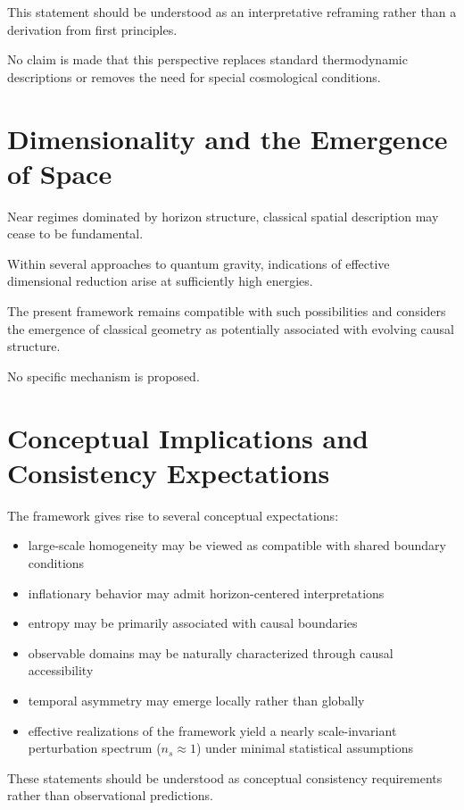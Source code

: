 \documentclass[12pt,a4paper]{article}
\begin{document}
This statement should be understood as an interpretative reframing rather than a derivation from first principles.

No claim is made that this perspective replaces standard thermodynamic descriptions or removes the need for special cosmological conditions.

\section{Dimensionality and the Emergence of Space}

Near regimes dominated by horizon structure, classical spatial description may cease to be fundamental.

Within several approaches to quantum gravity, indications of effective dimensional reduction arise at sufficiently high energies.

The present framework remains compatible with such possibilities and considers the emergence of classical geometry as potentially associated with evolving causal structure.

No specific mechanism is proposed.

\section{Conceptual Implications and Consistency Expectations}

The framework gives rise to several conceptual expectations:

\begin{itemize}
  \item large-scale homogeneity may be viewed as compatible with shared boundary conditions
  \item inflationary behavior may admit horizon-centered interpretations
  \item entropy may be primarily associated with causal boundaries
  \item observable domains may be naturally characterized through causal accessibility
  \item temporal asymmetry may emerge locally rather than globally
  \item effective realizations of the framework yield a nearly scale-invariant perturbation spectrum ($n_s \approx 1$) under minimal statistical assumptions
\end{itemize}

These statements should be understood as conceptual consistency requirements rather than observational predictions.
\end{document}
